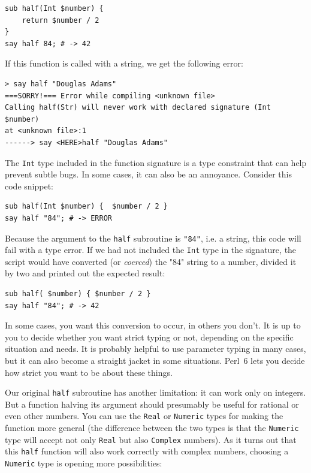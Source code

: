 \begin{verbatim}
sub half(Int $number) { 
    return $number / 2 
}
say half 84; # -> 42
\end{verbatim}

If this function is called with a string, we get the 
following error:

\begin{verbatim}
> say half "Douglas Adams"
===SORRY!=== Error while compiling <unknown file>
Calling half(Str) will never work with declared signature (Int $number)
at <unknown file>:1
------> say <HERE>half "Douglas Adams"
\end{verbatim}

The {\tt Int} type included in the function signature is a type 
constraint that can help prevent subtle bugs. In some cases, 
it can also be an annoyance. Consider this code snippet:


\begin{verbatim}
sub half(Int $number) {  $number / 2 }
say half "84"; # -> ERROR
\end{verbatim}

Because the argument to the {\tt half} subroutine is {\tt "84"}, 
i.e. a string, this code will fail with a type error. If we had 
not included the {\tt Int} type in the signature, the script 
would have converted (or \emph{coerced}) the "84" string to 
a number, divided it by two and printed out the expected result:

\begin{verbatim}
sub half( $number) { $number / 2 }
say half "84"; # -> 42
\end{verbatim}

In some cases, you want this conversion to occur, in others 
you don't. It is up to you to decide whether you want 
strict typing or not, depending on the specific situation and
needs. It is probably helpful to use parameter typing in many 
cases, but it can also become a straight jacket in some situations. 
Perl~6 lets you decide how strict you want to be about these things.

Our original {\tt half} subroutine has another limitation: it
can work only on integers. But a function halving its argument 
should presumably be useful for rational or even other numbers. 
You can use the {\tt Real} or {\tt Numeric} types for making 
the function more general (the difference between the two 
types is that the {\tt Numeric} type will accept not only 
{\tt Real} but also {\tt Complex} numbers). As it turns out 
that this {\tt half} function will also work correctly 
with complex numbers, choosing a {\tt Numeric} 
type is opening more possibilities:

